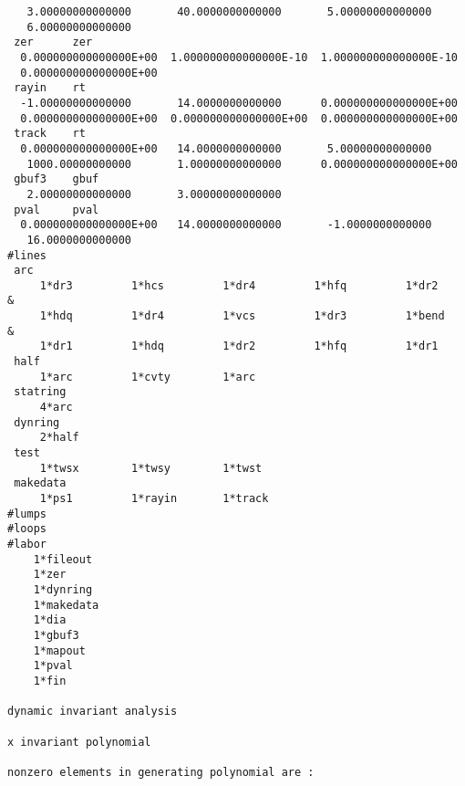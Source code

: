 \begin{footnotesize}
\begin{verbatim}
   3.00000000000000       40.0000000000000       5.00000000000000
   6.00000000000000
 zer      zer
  0.000000000000000E+00  1.000000000000000E-10  1.000000000000000E-10
  0.000000000000000E+00
 rayin    rt
  -1.00000000000000       14.0000000000000      0.000000000000000E+00
  0.000000000000000E+00  0.000000000000000E+00  0.000000000000000E+00
 track    rt
  0.000000000000000E+00   14.0000000000000       5.00000000000000
   1000.00000000000       1.00000000000000      0.000000000000000E+00
 gbuf3    gbuf
   2.00000000000000       3.00000000000000
 pval     pval
  0.000000000000000E+00   14.0000000000000       -1.0000000000000
   16.0000000000000
#lines
 arc
     1*dr3         1*hcs         1*dr4         1*hfq         1*dr2      &
     1*hdq         1*dr4         1*vcs         1*dr3         1*bend     &
     1*dr1         1*hdq         1*dr2         1*hfq         1*dr1
 half
     1*arc         1*cvty        1*arc
 statring
     4*arc
 dynring
     2*half
 test
     1*twsx        1*twsy        1*twst
 makedata
     1*ps1         1*rayin       1*track
#lumps
#loops
#labor
    1*fileout
    1*zer
    1*dynring
    1*makedata
    1*dia
    1*gbuf3
    1*mapout
    1*pval
    1*fin

dynamic invariant analysis

x invariant polynomial

nonzero elements in generating polynomial are :


\end{verbatim}
\end{footnotesize}
